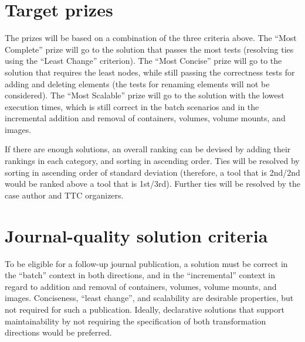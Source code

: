 \documentclass[sigconf,review]{acmart}
\begin{document}

\section{Target prizes}

The prizes will be based on a combination of the three criteria above. The
``Most Complete'' prize will go to the solution that passes the most tests
(resolving ties using the ``Least Change'' criterion). The ``Most Concise''
prize will go to the solution that requires the least nodes, while still passing
the correctness tests for adding and deleting elements (the tests for renaming
elements will not be considered). The ``Most Scalable'' prize will go to the
solution with the lowest execution times, which is still correct in the batch
scenarios and in the incremental addition and removal of containers, volumes,
volume mounts, and images.

If there are enough solutions, an overall ranking can be devised by adding their
rankings in each category, and sorting in ascending order. Ties will be resolved
by sorting in ascending order of standard deviation (therefore, a tool that is
2nd/2nd would be ranked above a tool that is 1st/3rd). Further ties will be
resolved by the case author and TTC organizers.

\section{Journal-quality solution criteria}

To be eligible for a follow-up journal publication, a solution must be correct
in the ``batch'' context in both directions, and in the ``incremental'' context
in regard to addition and removal of containers, volumes, volume mounts, and
images. Conciseness, ``least change'', and scalability are desirable properties,
but not required for such a publication. Ideally, declarative solutions that
support maintainability by not requiring the specification of both
transformation directions would be preferred.



\end{document}
